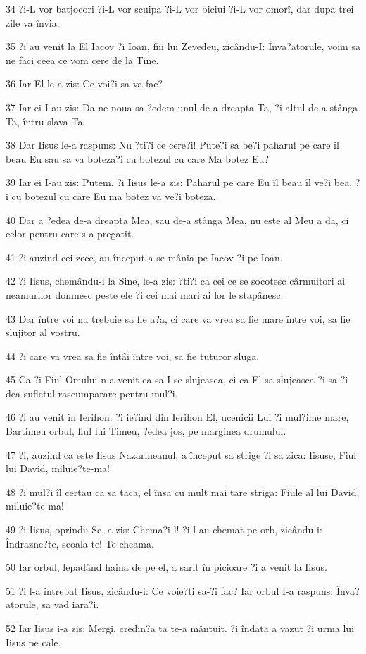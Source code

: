 \par 34 ?i-L vor batjocori ?i-L vor scuipa ?i-L vor biciui ?i-L vor omorî, dar dupa trei zile va învia.
\par 35 ?i au venit la El Iacov ?i Ioan, fiii lui Zevedeu, zicându-I: Înva?atorule, voim sa ne faci ceea ce vom cere de la Tine.
\par 36 Iar El le-a zis: Ce voi?i sa va fac?
\par 37 Iar ei I-au zis: Da-ne noua sa ?edem unul de-a dreapta Ta, ?i altul de-a stânga Ta, întru slava Ta.
\par 38 Dar Iisus le-a raspuns: Nu ?ti?i ce cere?i! Pute?i sa be?i paharul pe care îl beau Eu sau sa va boteza?i cu botezul cu care Ma botez Eu?
\par 39 Iar ei I-au zis: Putem. ?i Iisus le-a zis: Paharul pe care Eu îl beau îl ve?i bea, ?i cu botezul cu care Eu ma botez va ve?i boteza.
\par 40 Dar a ?edea de-a dreapta Mea, sau de-a stânga Mea, nu este al Meu a da, ci celor pentru care s-a pregatit.
\par 41 ?i auzind cei zece, au început a se mânia pe Iacov ?i pe Ioan.
\par 42 ?i Iisus, chemându-i la Sine, le-a zis: ?ti?i ca cei ce se socotesc cârmuitori ai neamurilor domnesc peste ele ?i cei mai mari ai lor le stapânesc.
\par 43 Dar între voi nu trebuie sa fie a?a, ci care va vrea sa fie mare între voi, sa fie slujitor al vostru.
\par 44 ?i care va vrea sa fie întâi între voi, sa fie tuturor sluga.
\par 45 Ca ?i Fiul Omului n-a venit ca sa I se slujeasca, ci ca El sa slujeasca ?i sa-?i dea sufletul rascumparare pentru mul?i.
\par 46 ?i au venit în Ierihon. ?i ie?ind din Ierihon El, ucenicii Lui ?i mul?ime mare, Bartimeu orbul, fiul lui Timeu, ?edea jos, pe marginea drumului.
\par 47 ?i, auzind ca este Iisus Nazarineanul, a început sa strige ?i sa zica: Iisuse, Fiul lui David, miluie?te-ma!
\par 48 ?i mul?i îl certau ca sa taca, el însa cu mult mai tare striga: Fiule al lui David, miluie?te-ma!
\par 49 ?i Iisus, oprindu-Se, a zis: Chema?i-l! ?i l-au chemat pe orb, zicându-i: Îndrazne?te, scoala-te! Te cheama.
\par 50 Iar orbul, lepadând haina de pe el, a sarit în picioare ?i a venit la Iisus.
\par 51 ?i l-a întrebat Iisus, zicându-i: Ce voie?ti sa-?i fac? Iar orbul I-a raspuns: Înva?atorule, sa vad iara?i.
\par 52 Iar Iisus i-a zis: Mergi, credin?a ta te-a mântuit. ?i îndata a vazut ?i urma lui Iisus pe cale.

